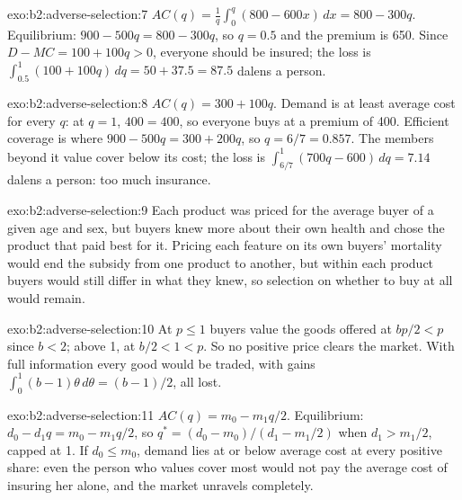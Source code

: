 \begin{solution}{exo:b2:adverse-selection:7}
$\mathit{AC}(q) = \frac1q\int_0^q (800 - 600x)\,dx = 800 - 300q$. Equilibrium: $900 - 500q = 800 - 300q$, so $q = 0.5$ and the premium is 650. Since $D - \mathit{MC} = 100 +
100q > 0$, everyone should be insured; the loss is $\int_{0.5}^1 (100 + 100q)\,dq = 50 + 37.5 = 87.5$ dalens a person.
\end{solution}

\begin{solution}{exo:b2:adverse-selection:8}
$\mathit{AC}(q) = 300 + 100q$. Demand is at least average cost for every $q$: at $q = 1$, $400 = 400$, so everyone buys at a premium of 400. Efficient
coverage is where $900 - 500q = 300 + 200q$, so $q = 6/7 = 0.857$. The members beyond it value cover below its cost; the loss is $\int_{6/7}^1 (700q
- 600)\,dq = 7.14$ dalens a person: too much insurance.
\end{solution}

\begin{solution}{exo:b2:adverse-selection:9}
Each product was priced for the average buyer of a given age and sex, but buyers knew more about their own health and chose the
product that paid best for it. Pricing each feature on its own buyers' mortality would end the subsidy from one product to
another, but within each product buyers would still differ in what they knew, so selection on whether to buy at all would
remain.
\end{solution}

\begin{solution}{exo:b2:adverse-selection:10}
At $p \le 1$ buyers value the goods offered at $bp/2 < p$ since $b < 2$; above 1, at $b/2 < 1 < p$. So no positive price clears the market. With full
information every good would be traded, with gains $\int_0^1 (b - 1)\theta\,d\theta = (b - 1)/2$, all lost.
\end{solution}

\begin{solution}{exo:b2:adverse-selection:11}
$\mathit{AC}(q) = m_0 - m_1q/2$. Equilibrium: $d_0 - d_1q = m_0 - m_1q/2$, so $q^* = (d_0 - m_0)/(d_1 - m_1/2)$ when $d_1 > m_1/2$, capped at 1. If $d_0 \le m_0$, demand lies at or
below average cost at every positive share: even the person who values cover most would not pay the average cost of
insuring her alone, and the market unravels completely.
\end{solution}

